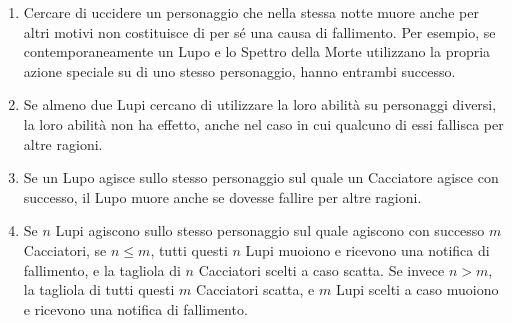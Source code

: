 \documentclass[a4paper,10pt]{article}
\begin{document}
\begin{enumerate}


	\item Cercare di uccidere un personaggio che nella stessa notte muore anche per altri motivi non costituisce di per sé una causa di fallimento.
	      Per esempio, se contemporaneamente un Lupo e lo Spettro della Morte utilizzano la propria azione speciale su di uno stesso personaggio, hanno entrambi successo.

	\item Se almeno due Lupi cercano di utilizzare la loro abilità su personaggi diversi, la loro abilità non ha effetto, anche nel caso in cui qualcuno di essi fallisca per altre ragioni.

	\item Se un Lupo agisce sullo stesso personaggio sul quale un Cacciatore agisce con successo, il Lupo muore anche se dovesse fallire per altre ragioni.

	\item Se $n$ Lupi agiscono sullo stesso personaggio sul quale agiscono con successo $m$ Cacciatori, se $n\le m$, tutti questi $n$ Lupi muoiono e ricevono una notifica di fallimento, e la tagliola di $n$ Cacciatori scelti a caso scatta.
	      Se invece $n>m$, la tagliola di tutti questi $m$ Cacciatori scatta, e $m$ Lupi scelti a caso muoiono e ricevono una notifica di fallimento.


\end{enumerate}
\end{document}
